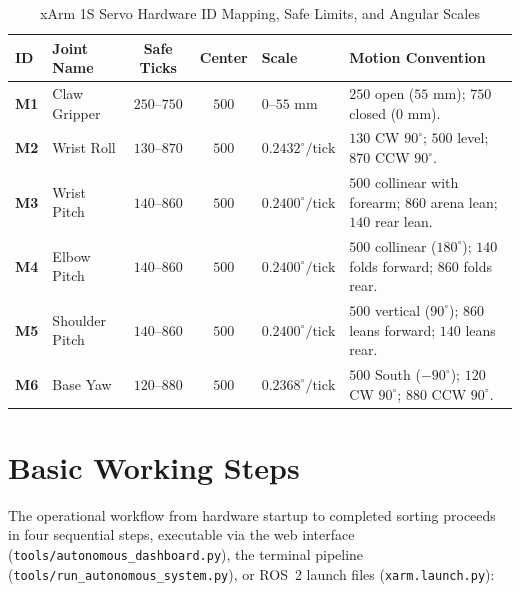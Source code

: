 \documentclass[11pt,a4paper]{article}
\begin{document}
\begin{table}[H]
  \centering
  \small
  \caption{xArm 1S Servo Hardware ID Mapping, Safe Limits, and Angular Scales}
  \label{tab:motors}
  \begin{tabularx}{\textwidth}{@{}>{\centering\arraybackslash}p{1.2cm} >{\raggedright\arraybackslash}p{2.3cm} c c >{\centering\arraybackslash}p{2.0cm} X@{}}
    \toprule
    \textbf{ID} & \textbf{Joint Name} & \textbf{Safe Ticks} & \textbf{Center} & \textbf{Scale} & \textbf{Motion Convention} \\
    \midrule
    \textbf{M1} & Claw Gripper & $250\text{--}750$ & $500$ & $0\text{--}55\text{ mm}$ & $250$ open ($55\text{ mm}$); $750$ closed ($0\text{ mm}$). \\
    \textbf{M2} & Wrist Roll & $130\text{--}870$ & $500$ & $0.2432^\circ/\text{tick}$ & $130$ CW $90^\circ$; $500$ level; $870$ CCW $90^\circ$. \\
    \textbf{M3} & Wrist Pitch & $140\text{--}860$ & $500$ & $0.2400^\circ/\text{tick}$ & $500$ collinear with forearm; $860$ arena lean; $140$ rear lean. \\
    \textbf{M4} & Elbow Pitch & $140\text{--}860$ & $500$ & $0.2400^\circ/\text{tick}$ & $500$ collinear ($180^\circ$); $140$ folds forward; $860$ folds rear. \\
    \textbf{M5} & Shoulder Pitch & $140\text{--}860$ & $500$ & $0.2400^\circ/\text{tick}$ & $500$ vertical ($90^\circ$); $860$ leans forward; $140$ leans rear. \\
    \textbf{M6} & Base Yaw & $120\text{--}880$ & $500$ & $0.2368^\circ/\text{tick}$ & $500$ South ($-90^\circ$); $120$ CW $90^\circ$; $880$ CCW $90^\circ$. \\
    \bottomrule
  \end{tabularx}
\end{table}

\section{Basic Working Steps}

The operational workflow from hardware startup to completed sorting proceeds in four sequential steps, executable via the web interface (\texttt{tools/autonomous\_dashboard.py}), the terminal pipeline (\texttt{tools/run\_autonomous\_system.py}), or ROS~2 launch files (\texttt{xarm.launch.py}):
\end{document}
